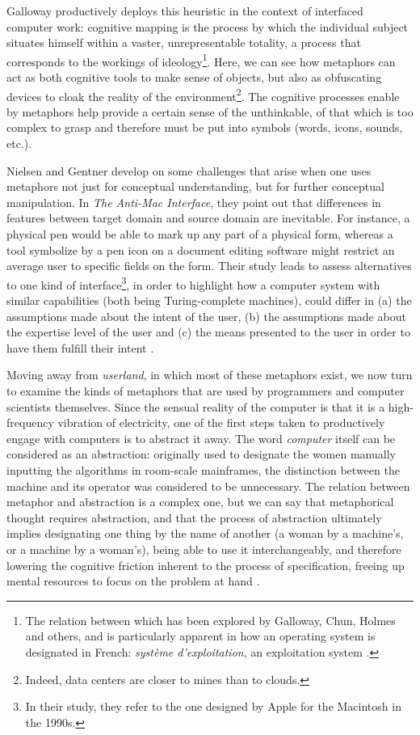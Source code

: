Galloway productively deploys this heuristic in the context of interfaced computer work: cognitive mapping is the process by which the individual subject situates himself within a vaster, unrepresentable totality, a process that corresponds to the workings of ideology\footnote{The relation between which has been explored by Galloway, Chun, Holmes and others, and is particularly apparent in how an operating system is designated in French: \emph{système d'exploitation}, an exploitation system \citep{galloway_language_2006a,chun_software_2005}.}. Here, we can see how metaphors can act as both cognitive tools to make sense of objects, but also as obfuscating devices to cloak the reality of the environment\footnote{Indeed, data centers are closer to mines than to clouds.}. The cognitive processes enable by metaphors help provide a certain sense of the unthinkable, of that which is too complex to grasp and therefore must be put into symbols (words, icons, sounds, etc.).

Nielsen and Gentner develop on some challenges that arise when one uses metaphors not just for conceptual understanding, but for further conceptual manipulation. In \emph{The Anti-Mac Interface}, they point out that differences in features between target domain and source domain are inevitable. For instance, a physical pen would be able to mark up any part of a physical form, whereas a tool symbolize by a pen icon on a document editing software might restrict an average user to specific fields on the form. Their study leads to assess alternatives to one kind of interface\footnote{In their study, they refer to the one designed by Apple for the Macintosh in the 1990s.}, in order to highlight how a computer system with similar capabilities (both being Turing-complete machines), could differ in (a) the assumptions made about the intent of the user, (b) the assumptions made about the expertise level of the user and (c) the means presented to the user in order to have them fulfill their intent \citep{gentner_antimac_1996}.

Moving away from \emph{userland}, in which most of these metaphors exist, we now turn to examine the kinds of metaphors that are used by programmers and computer scientists themselves. Since the sensual reality of the computer is that it is a high-frequency vibration of electricity, one of the first steps taken to productively engage with computers is to abstract it away. The word \emph{computer} itself can be considered as an abstraction: originally used to designate the women manually inputting the algorithms in room-scale mainframes, the distinction between the machine and its operator was considered to be unnecessary. The relation between metaphor and abstraction is a complex one, but we can say that metaphorical thought requires abstraction, and that the process of abstraction ultimately implies designating one thing by the name of another (a woman by a machine's, or a machine by a woman's), being able to use it interchangeably, and therefore lowering the cognitive friction inherent to the process of specification, freeing up mental resources to focus on the problem at hand \citep{chun_software_2005}.

